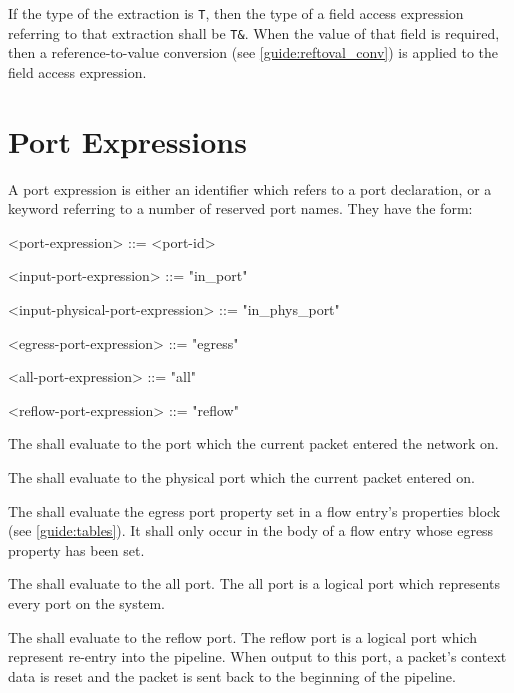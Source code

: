If the type of the extraction is \texttt{T}, then the type of a field access expression referring to that extraction shall be \texttt{T\&}. When the value of that field is required, then a reference-to-value conversion (see \ref{guide:reftoval_conv}) is applied to the field access expression.

\section{Port Expressions} \label{guide:port_expr}

A port expression is either an identifier which refers to a port declaration, or a keyword referring to a number of reserved port names. They have the form:

\begin{minip}
\begin{grammar}
<port-expression> ::= <port-id>

<input-port-expression> ::= "in_port"

<input-physical-port-expression> ::= "in_phys_port"

<egress-port-expression> ::= "egress"

<all-port-expression> ::= "all"

<reflow-port-expression> ::= "reflow"
\end{grammar}
\end{minip} 

The  shall evaluate to the port which the current packet entered the network on.

The  shall evaluate to the physical port which the current packet entered on.

The  shall evaluate the egress port property set in a flow entry's properties block (see \ref{guide:tables}). It shall only occur in the body of a flow entry whose egress property has been set.

The  shall evaluate to the all port. The all port is a logical port which represents every port on the system.

The  shall evaluate to the reflow port. The reflow port is a logical port which represent re-entry into the pipeline. When output to this port, a packet's context data is reset and the packet is sent back to the beginning of the pipeline.

